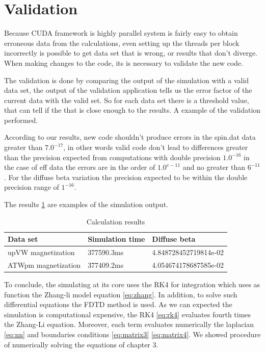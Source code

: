 \section{Validation}

Because CUDA framework is highly parallel system is fairly easy to obtain erroneous data from the calculations, even setting up the threads per block incorrectly is possible to get data set that is wrong, or results that don't diverge. When making changes to the code, its is necessary to validate the new code.

The validation is done by comparing the output of the simulation with a valid data set, the output of the validation application tells us the error factor of the current data with the valid set. So for each data set there is a threshold value, that can tell if the that is close enough to the results. A example of the validation performed.

According to our results, new code shouldn't produce errors in the spin.dat data greater than $7.0^{-17}$, in other words valid code don't lead to differences greater than the precision expected from computations with double precision $1.0^{-16}$ in the case of eff data the errors are in the order of $1.0^{e-11}$ and no greater than $6^{-11}$. For the diffuse beta variation the precision expected to be within the double precision range of $1^{-16}$. 

The results \ref{tab:results} are examples of the simulation output.

\begin{table}[h]
\centering
\begin{tabular}{| l | l | l |}
\hline
Data set & Simulation time & Diffuse beta  \\
\hline
upVW magnetization & 377590.3ms & 4.848728452719814e-02 \\
\hline
ATWpm magnetization & 377409.2ms & 4.054674178687585e-02 \\
\hline
\end{tabular}
\caption{Calculation results}
\label{tab:results}
\end{table}


\vspace{3.5em}

To conclude, the simulating at its core uses the RK4 for integration which uses as function the Zhang-li model equation \ref{eq:zhang}. In addition, to solve such differential equations the FDTD method is used. As we can expected the simulation is computational expensive, the RK4 \ref{eq:rk4} evaluates fourth times the Zhang-Li equation. Moreover, each term evaluates numerically the  laplacian \ref{eq:nn} and boundaries conditions \ref{eq:matrix3} \ref{eq:matrix4}. We showed procedure of numerically solving the equations of chapter 3.



